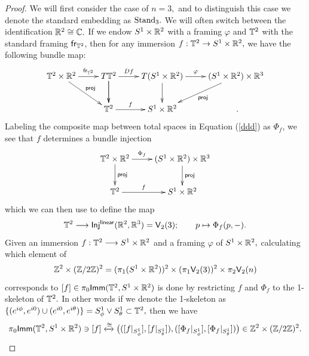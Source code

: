 \begin{proof}
We will first consider the case of $n = 3,$ and to distinguish this case we denote the standard embedding as ${\rm Stand}_{3}.$ We will often switch between the identification $\mathbb R^{2} \cong \mathbb C.$ If we endow $S^1 \times \mathbb R^{2}$ with a framing $\varphi$ and $\mathbb T^{2}$ with the standard framing ${\sf fr}_{\mathbb T^{2}}$, then for any immersion $f: \mathbb T^{2} \rightarrow S^{1} \times \mathbb R^{2},$ we have the following bundle map:
\begin{equation} \label{ddd}
\xymatrix{
\TT^{2} \times \RR^{2}\ar[r]^-{{\sf fr}_{\TT^{2}}}  \ar[dr]^-{{\sf proj}}
&
T\TT^{2} \ar[d]^-{}  \ar[r]^-{Df}  \ar[d]^-{}
&
T(S^{1} \times \RR^{2}) \ar[d]^-{} \ar[r]^-{\varphi}
&
(S^{1} \times \RR^{2}) \times \RR^{3} \ar[ld]^-{{\sf proj}}
\\
&
\TT^{2} \ar[r]^-{f}
&
S^{1} \times \RR^{2}  
&
~.
}
\end{equation}
Labeling the composite map between total spaces in Equation (\ref{ddd}) as $\Phi_{f}$, we see that $f$ determines a bundle injection
\[
\xymatrix{
\TT^{2} \times \RR^{2}\ar[r]^-{\Phi_{f}}  \ar[d]^-{{\sf proj}}
&
(S^{1} \times \RR^{2}) \times \RR^{3} \ar[d]^-{{\sf proj}}
\\
\TT^{2} \ar[r]^-{f}
&
S^{1} \times \RR^{2} 
}
\]
which we can then use to define the map
\begin{equation} \label{feq}
\mathbb T^{2} \longrightarrow {\sf Inj^{linear}}(\mathbb R^{2}, \mathbb R^{3}) = \mathsf V_{2}(3); \qquad p \mapsto \Phi_{f}(p, -).
\end{equation}
Given an immersion $f: \mathbb T^{2} \longrightarrow S^{1} \times \mathbb R^{2}$ and a framing $\varphi$ of $S^1 \times \mathbb R^{2},$ calculating which element of 
\[
\mathbb Z^{2} \times (\mathbb Z/2\mathbb Z)^{2} = (\pi_{1}(S^{1} \times \mathbb R^{2}))^{2} \times (\pi_{1}\mathsf V_{2}(3))^{2} \times \pi_{2}\mathsf V_{2}(n)
\]
corresponds to $[f] \in \pi_{0}{\sf Imm}(\mathbb T^{2}, S^{1} \times \mathbb R^{2})$ is done by restricting $f$ and $\Phi_{f}$ to the 1-skeleton of $\mathbb T^{2}.$ In other words if we denote the 1-skeleton as $\{(e^{i\phi}, e^{i0}) \cup (e^{i0}, e^{i\theta})\} = S^{1}_{\phi} \vee S^{1}_{\theta} \subset \mathbb T^{2},$ then we have \[
\pi_{0}{\sf Imm}(\mathbb T^{2}, S^{1} \times \mathbb R^{2}) \ni [f] \xleftrightarrow{\cong}
\big(([f|_{S^{1}_{\phi}}], [f|_{S^{1}_{\theta}}]), ([\Phi_{f}|_{S^{1}_{\phi}}], [\Phi_{f}|_{S^{1}_{\theta}}])\big) \in \mathbb Z^{2} \times (\mathbb Z/2\mathbb Z)^{2}.
\]


\end{proof}
